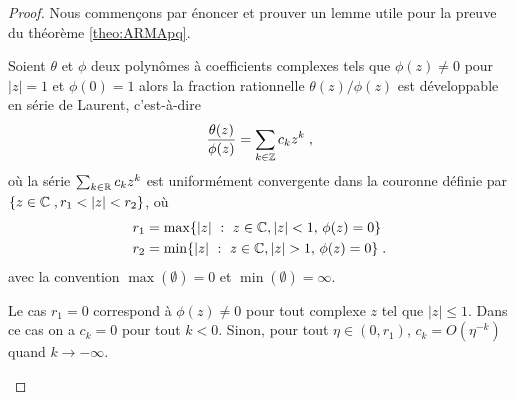 \begin{proof}\smartqed
Nous commen\c{c}ons par \'enoncer et prouver un lemme utile pour la preuve
du th\'eor\`eme \ref{theo:ARMApq}.
\begin{lemma}\label{lem:dev_laurent}
  Soient $\theta$ et $\phi$ deux polyn\^omes \`a coefficients complexes tels que
  $\phi(z) \neq 0$ pour $|z|=1$ et $\phi(0)=1$ alors la fraction rationnelle
  $\theta(z)/\phi(z)$ est d\'eveloppable en s\'erie de Laurent, c'est-\`a-dire
$$
\frac{\theta(z)}{\phi(z)}=\sum_{k\in\mathbb{Z}} c_k z^k\;,
$$
o\`u la s\'erie $\sum_{k \in \mathbb{R}} c_k z^k$ est uniform\'ement convergente dans la
couronne d\'efinie par
$\left\{ z\in\cset \eqsp, r_1<|z|<r_2 \right\}$, o\`u
\begin{align*}
r_1&=\max\{ |z|~:~ z \in \mathbb{C}, | z | < 1, \,\phi(z) =0 \}\\
r_2&=\min\{ |z|~:~ z  \in \mathbb{C}, |z| > 1, \,\phi(z) = 0 \}\; .
\end{align*}
avec la convention $\max(\emptyset)=0$ et $\min(\emptyset)=\infty$.

Le cas $r_1=0$ correspond \`a $\phi(z)\neq0$ pour tout complexe $z$ tel que
$|z|\leq1$. Dans ce cas on a $c_k=0$ pour tout $k<0$.
Sinon, pour tout $\eta\in(0,r_1)$, $c_k=O(\eta^{-k})$ quand $k\to-\infty$.


\end{lemma}
\end{proof}
